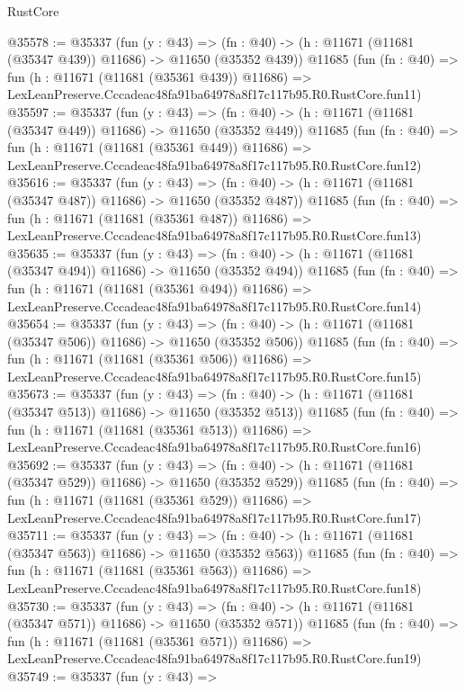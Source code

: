 \begin{lexlean}{RustCore}
\begin{coremodule}
@35578 := @35337
    (fun (y : @43) =>
    (fn : @40) -> (h : @11671 (@11681 (@35347 @439)) @11686) -> @11650 (@35352 @439))
    @11685
    (fun (fn : @40) =>
    fun (h : @11671 (@11681 (@35361 @439)) @11686) =>
    LexLeanPreserve.Cccadeac48fa91ba64978a8f17c117b95.R0.RustCore.fun11)
@35597 := @35337
    (fun (y : @43) =>
    (fn : @40) -> (h : @11671 (@11681 (@35347 @449)) @11686) -> @11650 (@35352 @449))
    @11685
    (fun (fn : @40) =>
    fun (h : @11671 (@11681 (@35361 @449)) @11686) =>
    LexLeanPreserve.Cccadeac48fa91ba64978a8f17c117b95.R0.RustCore.fun12)
@35616 := @35337
    (fun (y : @43) =>
    (fn : @40) -> (h : @11671 (@11681 (@35347 @487)) @11686) -> @11650 (@35352 @487))
    @11685
    (fun (fn : @40) =>
    fun (h : @11671 (@11681 (@35361 @487)) @11686) =>
    LexLeanPreserve.Cccadeac48fa91ba64978a8f17c117b95.R0.RustCore.fun13)
@35635 := @35337
    (fun (y : @43) =>
    (fn : @40) -> (h : @11671 (@11681 (@35347 @494)) @11686) -> @11650 (@35352 @494))
    @11685
    (fun (fn : @40) =>
    fun (h : @11671 (@11681 (@35361 @494)) @11686) =>
    LexLeanPreserve.Cccadeac48fa91ba64978a8f17c117b95.R0.RustCore.fun14)
@35654 := @35337
    (fun (y : @43) =>
    (fn : @40) -> (h : @11671 (@11681 (@35347 @506)) @11686) -> @11650 (@35352 @506))
    @11685
    (fun (fn : @40) =>
    fun (h : @11671 (@11681 (@35361 @506)) @11686) =>
    LexLeanPreserve.Cccadeac48fa91ba64978a8f17c117b95.R0.RustCore.fun15)
@35673 := @35337
    (fun (y : @43) =>
    (fn : @40) -> (h : @11671 (@11681 (@35347 @513)) @11686) -> @11650 (@35352 @513))
    @11685
    (fun (fn : @40) =>
    fun (h : @11671 (@11681 (@35361 @513)) @11686) =>
    LexLeanPreserve.Cccadeac48fa91ba64978a8f17c117b95.R0.RustCore.fun16)
@35692 := @35337
    (fun (y : @43) =>
    (fn : @40) -> (h : @11671 (@11681 (@35347 @529)) @11686) -> @11650 (@35352 @529))
    @11685
    (fun (fn : @40) =>
    fun (h : @11671 (@11681 (@35361 @529)) @11686) =>
    LexLeanPreserve.Cccadeac48fa91ba64978a8f17c117b95.R0.RustCore.fun17)
@35711 := @35337
    (fun (y : @43) =>
    (fn : @40) -> (h : @11671 (@11681 (@35347 @563)) @11686) -> @11650 (@35352 @563))
    @11685
    (fun (fn : @40) =>
    fun (h : @11671 (@11681 (@35361 @563)) @11686) =>
    LexLeanPreserve.Cccadeac48fa91ba64978a8f17c117b95.R0.RustCore.fun18)
@35730 := @35337
    (fun (y : @43) =>
    (fn : @40) -> (h : @11671 (@11681 (@35347 @571)) @11686) -> @11650 (@35352 @571))
    @11685
    (fun (fn : @40) =>
    fun (h : @11671 (@11681 (@35361 @571)) @11686) =>
    LexLeanPreserve.Cccadeac48fa91ba64978a8f17c117b95.R0.RustCore.fun19)
@35749 := @35337
    (fun (y : @43) =>

\end{coremodule}
\end{lexlean}
